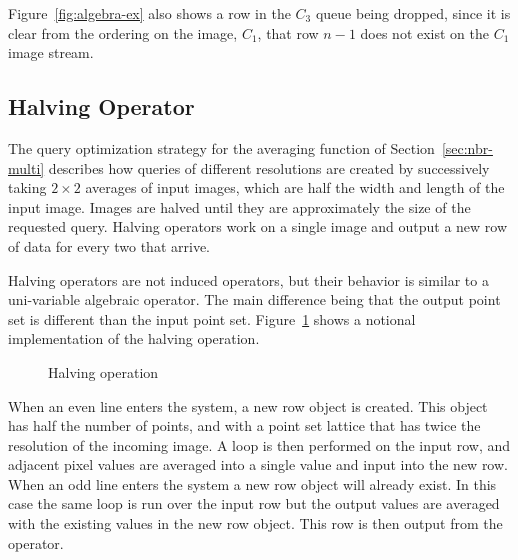 \documentclass{ucdthesis}       %
\newcommand{\meth}{\negthickspace \rightarrow \negthickspace}
\newcommand{\METH}[2]{\meth\CALL{#1}{#2}}
\begin{document}
Figure~\ref{fig:algebra-ex} also shows a row in the $C_3$ queue
being dropped, since it is clear from the ordering on the image,
$C_1$, that row $n-1$ does not exist on the $C_1$ image stream.




\subsection{Halving Operator}
\label{sec:halve-op}

The query optimization strategy for the averaging function of
Section~\ref{sec:nbr-multi} describes how queries of different
resolutions are created by successively taking $2 \times 2$ averages
of input images, which are half the width and length of the input
image.  Images are halved until they are approximately the size of the
requested query.  Halving operators work on a single image and output
a new row of data for every two that arrive.

Halving operators are not induced operators, but their behavior is
similar to a uni-variable algebraic operator.  The main difference
being that the output point set is different than the input point set.
Figure~\ref{fig:halve-ex} shows a notional implementation of the
halving operation.

\begin{figure}[htb]
  \centering
  
  \caption{Halving operation}
  \label{fig:halve-ex}
\end{figure}

When an even line enters the system, a new row object is created. This
object has half the number of points, and with a point set lattice
that has twice the resolution of the incoming image.  A loop is then
performed on the input row, and adjacent pixel values are averaged
into a single value and input into the new row.  When an odd line
enters the system a new row object will already exist.  In this case
the same loop is run over the input row but the output values are
averaged with the existing values in the new row object.  This row is
then output from the operator.
\end{document}
